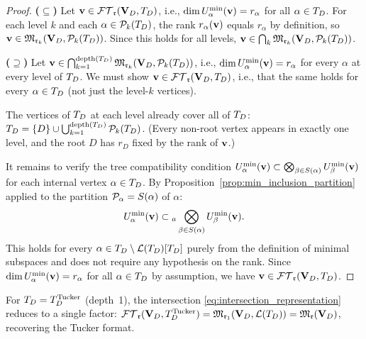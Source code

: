 \begin{proof}
\textbf{($\subseteq$)} Let $\mathbf{v} \in \mathcal{FT}_{\mathfrak{r}}(\mathbf{V}_D,T_D)$, i.e., $\dim U^{\min}_{\alpha}(\mathbf{v})
= r_\alpha$ for all $\alpha \in T_D$. For each level $k$ and each
$\alpha \in \mathcal{P}_{k}(T_D)$, the rank $r_\alpha(\mathbf{v})$ equals $r_\alpha$
by definition, so $\mathbf{v} \in \mathfrak{M}_{\mathfrak{r}_k}(\mathbf{V}_D, \mathcal{P}_{k}(T_D))$. Since
this holds for all levels, $\mathbf{v} \in \bigcap_k
\mathfrak{M}_{\mathfrak{r}_k}(\mathbf{V}_D, \mathcal{P}_{k}(T_D))$.

\textbf{($\supseteq$)} Let $\mathbf{v} \in \bigcap_{k=1}^{\mathrm{depth}(T_D)}
\mathfrak{M}_{\mathfrak{r}_k}(\mathbf{V}_D, \mathcal{P}_{k}(T_D))$, i.e., $\dim U^{\min}_{\alpha}(\mathbf{v})
= r_\alpha$ for every $\alpha$ at every level of $T_D$. We must show
$\mathbf{v} \in \mathcal{FT}_{\mathfrak{r}}(\mathbf{V}_D,T_D)$, i.e., that the same holds for every $\alpha \in T_D$
(not just the level-$k$ vertices).

The vertices of $T_D$ at each level already cover all of $T_D$:
$T_D = \{D\} \cup \bigcup_{k=1}^{\mathrm{depth}(T_D)} \mathcal{P}_{k}(T_D)$. (Every
non-root vertex appears in exactly one level, and the root $D$ has
$r_D$ fixed by the rank of $\mathbf{v}$.)

It remains to verify the tree compatibility condition
$U^{\min}_{\alpha}(\mathbf{v}) \subset \bigotimes_{\beta \in S(\alpha)}
U^{\min}_{\beta}(\mathbf{v})$ for each internal vertex $\alpha \in T_D$.
By Proposition~\ref{prop:min_inclusion_partition} applied to the
partition $\mathcal{P}_\alpha = S(\alpha)$ of $\alpha$:
\begin{equation*}
    U^{\min}_{\alpha}(\mathbf{v})
    \subset {}_a\bigotimes_{\beta \in S(\alpha)} U^{\min}_{\beta}(\mathbf{v}).
\end{equation*}
This holds for every $\alpha \in T_D \setminus \mathcal{L}(T_D)[T_D]$ purely from
the definition of minimal subspaces and does not require any hypothesis
on the rank. Since $\dim U^{\min}_{\alpha}(\mathbf{v}) = r_\alpha$ for all
$\alpha \in T_D$ by assumption, we have $\mathbf{v} \in \mathcal{FT}_{\mathfrak{r}}(\mathbf{V}_D,T_D)$.
\end{proof}

\begin{remark}
\label{rem:tucker_as_intersection}
For $T_D = T_D^{\mathrm{Tucker}}$ (depth~1), the intersection
\eqref{eq:intersection_representation} reduces to a single factor:
$\mathcal{FT}_{\mathfrak{r}}(\mathbf{V}_D,T_D^{\mathrm{Tucker}}) = \mathfrak{M}_{\mathfrak{r}_1}(\mathbf{V}_D, \mathcal{L}(T_D)) =
\mathfrak{M}_{\mathfrak{r}}(\mathbf{V}_D)$, recovering the Tucker format.
\end{remark}

